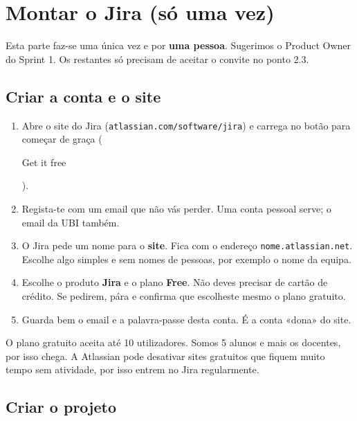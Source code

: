 \documentclass[11pt,a4paper]{article}
\newcommand{\btn}[1]{{\setlength{\fboxsep}{1.6pt}\colorbox{azulclaro}{\sffamily\small\strut #1}}}
\begin{document}
\section{Montar o Jira (só uma vez)}

Esta parte faz-se uma única vez e por \textbf{uma pessoa}. Sugerimos o Product Owner do Sprint 1. Os restantes só precisam de aceitar o convite no ponto 2.3.

\subsection{Criar a conta e o site}

\begin{enumerate}
  \item Abre o site do Jira (\texttt{atlassian.com/software/jira}) e carrega no botão para começar de graça (\btn{Get it free}).
  \item Regista-te com um email que não vás perder. Uma conta pessoal serve; o email da UBI também.
  \item O Jira pede um nome para o \textbf{site}. Fica com o endereço \texttt{nome.atlassian.net}. Escolhe algo simples e sem nomes de pessoas, por exemplo o nome da equipa.
  \item Escolhe o produto \textbf{Jira} e o plano \textbf{Free}. Não deves precisar de cartão de crédito. Se pedirem, pára e confirma que escolheste mesmo o plano gratuito.
  \item Guarda bem o email e a palavra-passe desta conta. É a conta «dona» do site.
\end{enumerate}

\begin{tcolorbox}[atencao, title={Atenção}]
  O plano gratuito aceita até 10 utilizadores. Somos 5 alunos e mais os docentes, por isso chega. A Atlassian pode desativar sites gratuitos que fiquem muito tempo sem atividade, por isso entrem no Jira regularmente.
\end{tcolorbox}

\subsection{Criar o projeto}
\end{document}
